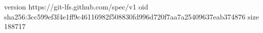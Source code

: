 version https://git-lfs.github.com/spec/v1
oid sha256:3cc599ef3f4e1ff9c46116982f508830fd996d720f7aa7a25409637eab374876
size 188717
